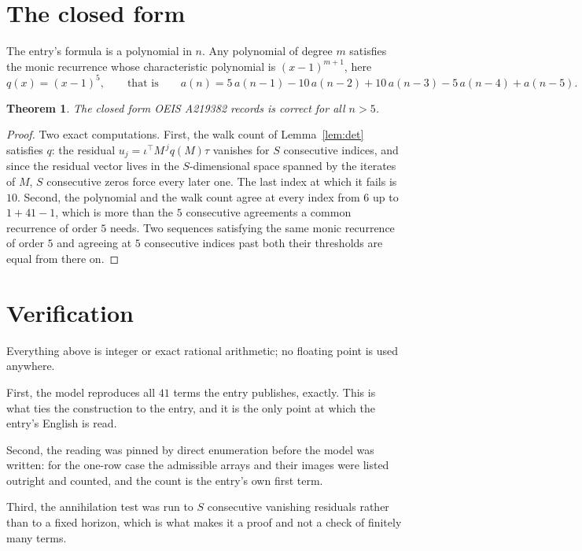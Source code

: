 \documentclass[11pt,a4paper]{article}
\theoremstyle{plain}
\newtheorem{theorem}{Theorem}
\theoremstyle{definition}
\begin{document}
\section{The closed form}

The entry's formula is a polynomial in $n$. Any polynomial of degree $m$ satisfies the monic
recurrence whose characteristic polynomial is $(x-1)^{m+1}$, here
\[
q(x)=(x-1)^{5},\qquad\text{that is}\qquad a(n)=5\,a(n-1) - 10\,a(n-2) + 10\,a(n-3) - 5\,a(n-4) + a(n-5).
\]

\begin{theorem}
The closed form OEIS A219382 records is correct for all $n>5$.
\end{theorem}

\begin{proof}
Two exact computations. First, the walk count of Lemma~\ref{lem:det} satisfies $q$: the
residual $u_j=\iota^{\!\top}M^{\,j}q(M)\tau$ vanishes for $S$ consecutive indices, and
since the residual vector lives in the $S$-dimensional space spanned by the iterates of $M$,
$S$ consecutive zeros force every later one. The last index at which it fails is $10$.
Second, the polynomial and the walk count agree at every index from $6$ up to
$1 + 41 - 1$, which is more than the $5$ consecutive agreements a
common recurrence of order $5$ needs. Two sequences satisfying the same monic recurrence
of order $5$ and agreeing at $5$ consecutive indices past both their thresholds are
equal from there on.
\end{proof}

\section{Verification}

Everything above is integer or exact rational arithmetic; no floating point is used anywhere.

First, the model reproduces all $41$ terms the entry publishes, exactly. This is what
ties the construction to the entry, and it is the only point at which the entry's English is
read.

Second, the reading was pinned by direct enumeration before the model was written: for the
one-row case the admissible arrays and their images were listed outright and counted, and the
count is the entry's own first term.

Third, the annihilation test was run to $S$ consecutive vanishing residuals rather than to a
fixed horizon, which is what makes it a proof and not a check of finitely many terms.
\end{document}
